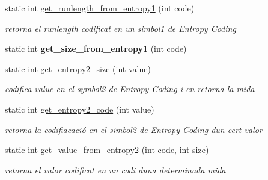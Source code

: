 \begin{DoxyCompactItemize}
static int \hyperlink{classdomini_1_1algorithm_1_1JPEG_ac58cb434a7acfd90fc8e548fd7c00ae2}{get\+\_\+runlength\+\_\+from\+\_\+entropy1} (int code)
\begin{DoxyCompactList}\small\item\em retorna el runlength codificat en un simbol1 de Entropy Coding \end{DoxyCompactList}\item 
\mbox{\label{classdomini_1_1algorithm_1_1JPEG_a8d1005fb7833d36a064afb1c5e15bbd3}} 
static int {\bfseries get\+\_\+size\+\_\+from\+\_\+entropy1} (int code)
\item 
\mbox{\label{classdomini_1_1algorithm_1_1JPEG_aa9bc9bee7181efee254be843e23ee2c6}} 
static int \hyperlink{classdomini_1_1algorithm_1_1JPEG_aa9bc9bee7181efee254be843e23ee2c6}{get\+\_\+entropy2\+\_\+size} (int value)
\begin{DoxyCompactList}\small\item\em codifica value en el symbol2 de Entropy Coding i en retorna la mida \end{DoxyCompactList}\item 
\mbox{\label{classdomini_1_1algorithm_1_1JPEG_a0ccbcda5311dc96a30e5cb7f2a5b95b5}} 
static int \hyperlink{classdomini_1_1algorithm_1_1JPEG_a0ccbcda5311dc96a30e5cb7f2a5b95b5}{get\+\_\+entropy2\+\_\+code} (int value)
\begin{DoxyCompactList}\small\item\em retorna la codifiacació en el simbol2 de Entropy Coding d\textquotesingle{}un cert valor \end{DoxyCompactList}\item 
\mbox{\label{classdomini_1_1algorithm_1_1JPEG_a41c69fe2e29999dd17a555859df22530}} 
static int \hyperlink{classdomini_1_1algorithm_1_1JPEG_a41c69fe2e29999dd17a555859df22530}{get\+\_\+value\+\_\+from\+\_\+entropy2} (int code, int size)
\begin{DoxyCompactList}\small\item\em retorna el valor codificat en un codi d\textquotesingle{}una determinada mida \end{DoxyCompactList}\end{DoxyCompactItemize}
